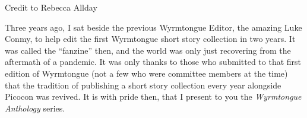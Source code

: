 \documentclass{picocon-fanzine}
\begin{document}
\begin{titlepage}
            \vspace*{20cm}
            \color{white}
            \fontsize{25}{48}\selectfont 
\end{titlepage}
\begin{center}
    \normalfont Credit to Rebecca Allday
\end{center}
\setcounter{page}{1}
\clearpage
{}
\setcounter{page}{1}
Three years ago, I sat beside the previous Wyrmtongue Editor, the amazing Luke Conmy, to help edit the first Wyrmtongue short story collection in two years. It was called the “fanzine” then, and the world was only just recovering from the aftermath of a pandemic. It was only thanks to those who submitted to that first edition of Wyrmtongue (not a few who were committee members at the time) that the tradition of publishing a short story collection every year alongside Picocon was revived. It is with pride then, that I present to you the \textit{Wyrmtongue Anthology} series. 
\end{document}
